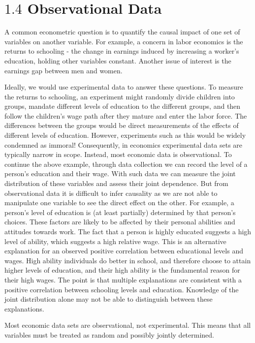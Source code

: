 \documentclass[10pt]{article}
\begin{document}
\section{$1.4$ Observational Data}
A common econometric question is to quantify the causal impact of one set of variables on another variable. For example, a concern in labor economics is the returns to schooling - the change in earnings induced by increasing a worker's education, holding other variables constant. Another issue of interest is the earnings gap between men and women.

Ideally, we would use experimental data to answer these questions. To measure the returns to schooling, an experiment might randomly divide children into groups, mandate different levels of education to the different groups, and then follow the children's wage path after they mature and enter the labor force. The differences between the groups would be direct measurements of the effects of different levels of education. However, experiments such as this would be widely condemned as immoral! Consequently, in economics experimental data sets are typically narrow in scope. Instead, most economic data is observational. To continue the above example, through data collection we can record the level of a person's education and their wage. With such data we can measure the joint distribution of these variables and assess their joint dependence. But from observational data it is difficult to infer causality as we are not able to manipulate one variable to see the direct effect on the other. For example, a person's level of education is (at least partially) determined by that person's choices. These factors are likely to be affected by their personal abilities and attitudes towards work. The fact that a person is highly educated suggests a high level of ability, which suggests a high relative wage. This is an alternative explanation for an observed positive correlation between educational levels and wages. High ability individuals do better in school, and therefore choose to attain higher levels of education, and their high ability is the fundamental reason for their high wages. The point is that multiple explanations are consistent with a positive correlation between schooling levels and education. Knowledge of the joint distribution alone may not be able to distinguish between these explanations.

Most economic data sets are observational, not experimental. This means that all variables must be treated as random and possibly jointly determined.
\end{document}
